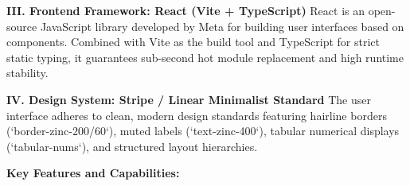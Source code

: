 \documentclass[12pt,a4paper]{article}
\begin{document}
\textbf{III. Frontend Framework: React (Vite + TypeScript)}
React is an open-source JavaScript library developed by Meta for building user interfaces based on components. Combined with Vite as the build tool and TypeScript for strict static typing, it guarantees sub-second hot module replacement and high runtime stability.

\textbf{IV. Design System: Stripe / Linear Minimalist Standard}
The user interface adheres to clean, modern design standards featuring hairline borders (`border-zinc-200/60`), muted labels (`text-zinc-400`), tabular numerical displays (`tabular-nums`), and structured layout hierarchies.

\newpage
\textbf{Key Features and Capabilities:}
\end{document}
